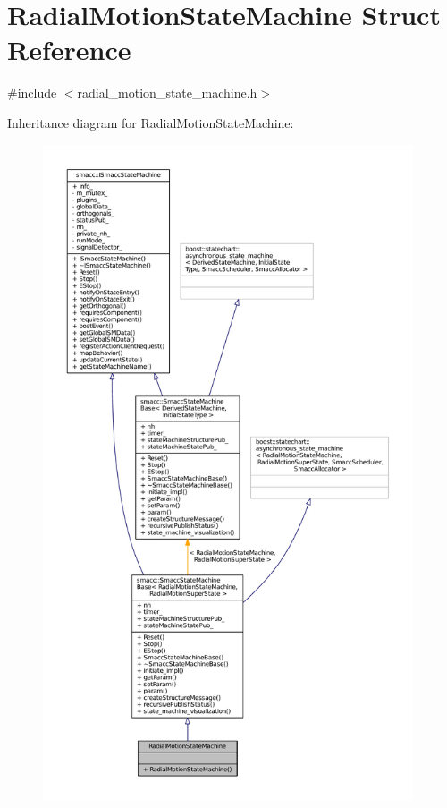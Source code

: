 \hypertarget{structRadialMotionStateMachine}{}\section{Radial\+Motion\+State\+Machine Struct Reference}
\label{structRadialMotionStateMachine}


{\ttfamily \#include $<$radial\+\_\+motion\+\_\+state\+\_\+machine.\+h$>$}



Inheritance diagram for Radial\+Motion\+State\+Machine\+:
\nopagebreak
\begin{figure}[H]
\begin{center}
\leavevmode
\includegraphics[height=550pt]{structRadialMotionStateMachine__inherit__graph}
\end{center}
\end{figure}


